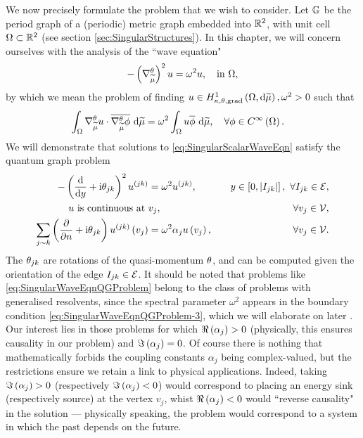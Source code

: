 We now precisely formulate the problem that we wish to consider.
Let $\mathbb{G}$ be the period graph of a (periodic) metric graph embedded into $\mathbb{R}^2$, with unit cell $\Omega\subset\mathbb{R}^2$ (see section \ref{sec:SingularStructures}).
In this chapter, we will concern ourselves with the analysis of the ``wave equation"
\begin{align} \label{eq:SingularScalarWaveEqn}
	-\left( \nabla^{\theta}_{\widetilde{\mu}} \right)^2 u = \omega^2 u, \quad\text{in } \Omega,
\end{align}
by which we mean the problem of finding $u\in H^1_{\kappa,\theta,\mathrm{grad}}\left( \Omega, \mathrm{d}\widetilde{\mu} \right), \omega^2>0$ such that
\begin{align*}
	\int_{\Omega} \nabla^{\theta}_{\widetilde{\mu}}u\cdot\overline{\nabla^{\theta}_{\widetilde{\mu}}\phi}  \ \mathrm{d}\widetilde{\mu} 
	&= \omega^2\int_{\Omega} u\overline{\phi}  \ \mathrm{d}\widetilde{\mu}, \quad\forall\phi\in C^{\infty}\left( \Omega \right).
\end{align*}
We will demonstrate that solutions to \eqref{eq:SingularScalarWaveEqn} satisfy the quantum graph problem
\begin{subequations} \label{eq:SingularWaveEqnQGProblem}
	\begin{align}
		-\left( \dfrac{\mathrm{d}}{\mathrm{d}y} + \mathrm{i}\theta_{jk} \right)^2 u^{(jk)} &= \omega^2 u^{(jk)}, \quad &y\in\left[ 0,\left\lvert I_{jk} \right\rvert \right], \ \forall I_{jk}\in\mathcal{E}, \label{eq:SingularWaveEqnQGProblem-1} \\
		u \text{ is continuous at } & v_j, \quad &\forall v_j\in\mathcal{V}, \label{eq:SingularWaveEqnQGProblem-2} \\
		\sum_{j\sim k}\left( \dfrac{\partial }{\partial n} + \mathrm{i}\theta_{jk} \right)u^{(jk)}\left( v_j \right) &= \omega^2\alpha_j u\left( v_j \right), \quad &\forall v_j\in\mathcal{V}. \label{eq:SingularWaveEqnQGProblem-3}
	\end{align}
\end{subequations}
The $\theta_{jk}$ are rotations of the quasi-momentum $\theta$, and can be computed given the orientation of the edge $I_{jk}\in\mathcal{E}$.
It should be noted that problems like \eqref{eq:SingularWaveEqnQGProblem} belong to the class of problems with generalised resolvents, since the spectral parameter $\omega^2$ appears in the boundary condition \eqref{eq:SingularWaveEqnQGProblem-3}, which we will elaborate on later .
Our interest lies in those problems for which $\Re\left( \alpha_j \right)>0$ (physically, this ensures causality in our problem) and $\Im\left( \alpha_j \right) = 0$.
Of course there is nothing that mathematically forbids the coupling constants $\alpha_j$ being complex-valued, but the restrictions ensure we retain a link to physical applications. 
Indeed, taking $\Im\left( \alpha_j \right) > 0$ (respectively $\Im\left( \alpha_j \right) < 0$) would correspond to placing an energy sink (respectively source) at the vertex $v_j$, whist $\Re\left( \alpha_j \right)<0$ would ``reverse causality" in the solution --- physically speaking, the problem would correspond to a system in which the past depends on the future.

